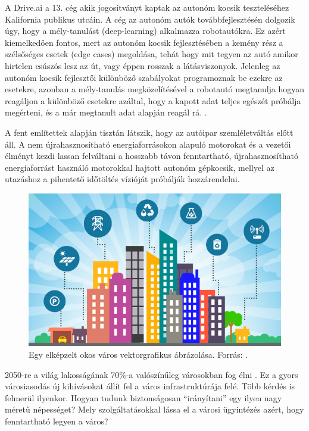 \documentclass[a4paper,12pt]{report}
\begin{document}
\vspace{2mm}
A Drive.ai a 13. cég akik jogosítványt kaptak az autonóm kocsik teszteléséhez Kalifornia publikus utcáin. A cég az autonóm autók továbbfejlesztésén dolgozik úgy, hogy a mély-tanulást (deep-learning) alkalmazza robotautókra. Ez azért kiemelkedően fontos, mert az autonóm kocsik fejlesztésében a kemény rész a szélsőséges esetek (edge cases) megoldása, tehát hogy mit tegyen az autó amikor hirtelen csúszós lesz az út, vagy éppen rosszak a látásviszonyok. Jelenleg az autonóm kocsik fejlesztői különböző szabályokat programoznak be ezekre az esetekre, azonban a mély-tanulás megközelítésével a robotautó megtanulja hogyan reagáljon a különböző esetekre azáltal, hogy a kapott adat teljes egészét próbálja megérteni, és a már megtanult adat alapján reagál rá. \cite{driveai}.

\vspace{2mm}
A fent említettek alapján tisztán látszik, hogy az autóipar szemléletváltás előtt áll. A nem újrahasznosítható energiaforrásokon alapuló motorokat és a vezetői élményt kezdi lassan felváltani a hosszabb távon fenntartható, újrahasznosítható energiaforrást használó motorokkal hajtott autonóm gépkocsik, mellyel az utazáshoz a pihentető időtöltés vízióját próbálják hozzárendelni.

\begin{figure}[ht]
\centerline{
\includegraphics[width=6in]{img/smartcitylogo}}
\caption{Egy elképzelt okos város vektorgrafikus ábrázolása. Forrás: \cite{smartcitylogo}.}
\label{smartcitylogo}
\end{figure}

\vspace{2mm}
2050-re a világ lakosságának 70\%-a valószínűleg városokban fog élni \cite{unpopulation}. Ez a gyors városiasodás új kihívásokat állít fel a város infrastruktúrája felé. Több kérdés is felmerül ilyenkor. Hogyan tudunk biztonságosan ``irányítani'' egy ilyen nagy méretű népességet? Mely szolgáltatásokkal lássa el a városi ügyintézés azért, hogy fenntartható legyen a város? 
\end{document}

